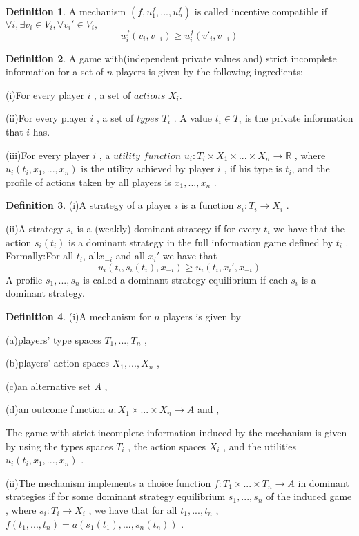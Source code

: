 \documentclass[10pt,reqno]{amsart}
\theoremstyle{definition}
\newtheorem{defn}{Definition}[section]
\theoremstyle{remark}
\numberwithin{equation}{section}
\begin{document}
\begin{defn}
A mechanism $(f,u_1^f,...,u_n^f) $ is called incentive compatible if $\forall i, \exists  v_i \in V_i, \forall v_i' \in V_i,  $  %
\begin{equation}
u_i^f(v_i,v_{-i} )\geq u_i^f(v'_i,v_{-i} )
\end{equation}
\end{defn}

\begin{defn}
A game with(independent private values and) strict incomplete information for a set of $n$ players is given by the following ingredients:

(i)For every player $i$ , a set of $actions$ $X_i$.

(ii)For every player $i$ , a set of $types$ $T_i$ . A value $t_i\in T_i$ is the private information that $i$ has.

(iii)For every player $i$ , a $utility$ $function$ $u_i: T_i \times X_1\times ...\times X_n\rightarrow \mathbb{R}$ , where $u_i(t_i,x_1,...,x_n)$ is the utility achieved by player $i$ , if his type is $t_i$, and the profile of actions taken by all players is $x_1,...,x_n$ . 
\end{defn}

\begin{defn}
(i)A strategy of a player $i$ is a function $s_i:T_i\rightarrow X_i$ .

(ii)A strategy $s_i$ is a (weakly) dominant strategy if for every $t_i$ we have that the action $s_i(t_i)$ is a dominant strategy in the full information game defined by $t_i$ . Formally:For all $t_i$, all$x_{-i}$ and all $x_i'$ we have that
\begin{equation}
 u_i(t_i,  s_i(t_i),x_{-i})\ge u_i(t_i, x_i',x_{-i})
\end{equation}
 A profile $s_1,...,s_n$ is called a dominant strategy equilibrium if each $s_i$ is a dominant strategy.
\end{defn}

\begin{defn}
(i)A mechanism for $n$ players is given by

(a)players' type spaces $T_1,...,T_n$ ,

(b)players' action spaces $X_1,...,X_n$ ,

(c)an alternative set $A$ ,

(d)an outcome function $a:X_1\times...\times X_n\rightarrow A$ and ,


The game with strict incomplete information induced by the mechanism is given by using the types spaces $T_i$ , the action spaces $X_i$ , and the utilities $u_i(t_i,x_1,...,x_n)$ .

(ii)The mechanism implements a choice function $f:T_1\times...\times T_n\rightarrow A$ in dominant strategies if for some dominant strategy equilibrium $s_1,...,s_n$ of the induced game , where $s_i:T_i\rightarrow X_i$ , we have that for all $t_1,...,t_n$ , $f(t_1,...,t_n)=a(s_1(t_1),...,s_n(t_n))$ .

\end{defn}
\end{document}
